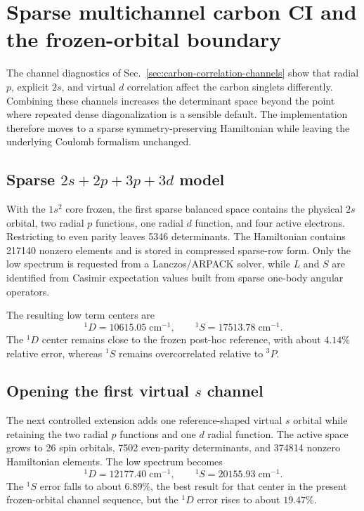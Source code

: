 \section{Sparse multichannel carbon CI and the frozen-orbital boundary}
\label{sec:carbon-sparse-multichannel}

The channel diagnostics of Sec.~\ref{sec:carbon-correlation-channels} show that radial $p$, explicit $2s$, and virtual $d$ correlation affect the carbon singlets differently.  Combining these channels increases the determinant space beyond the point where repeated dense diagonalization is a sensible default.  The implementation therefore moves to a sparse symmetry-preserving Hamiltonian while leaving the underlying Coulomb formalism unchanged.

\subsection{Sparse $2s+2p+3p+3d$ model}
With the $1s^2$ core frozen, the first sparse balanced space contains the physical $2s$ orbital, two radial $p$ functions, one radial $d$ function, and four active electrons.  Restricting to even parity leaves 5346 determinants.  The Hamiltonian contains 217140 nonzero elements and is stored in compressed sparse-row form.  Only the low spectrum is requested from a Lanczos/ARPACK solver, while $L$ and $S$ are identified from Casimir expectation values built from sparse one-body angular operators.

The resulting low term centers are
\begin{equation}
^1D=10615.05\;\mathrm{cm^{-1}},\qquad
^1S=17513.78\;\mathrm{cm^{-1}}.
\end{equation}
The $^1D$ center remains close to the frozen post-hoc reference, with about $4.14\%$ relative error, whereas $^1S$ remains overcorrelated relative to $^3P$.

\subsection{Opening the first virtual $s$ channel}
The next controlled extension adds one reference-shaped virtual $s$ orbital while retaining the two radial $p$ functions and one $d$ radial function.  The active space grows to 26 spin orbitals, 7502 even-parity determinants, and 374814 nonzero Hamiltonian elements.  The low spectrum becomes
\begin{equation}
^1D=12177.40\;\mathrm{cm^{-1}},\qquad
^1S=20155.93\;\mathrm{cm^{-1}}.
\end{equation}
The $^1S$ error falls to about $6.89\%$, the best result for that center in the present frozen-orbital channel sequence, but the $^1D$ error rises to about $19.47\%$.

